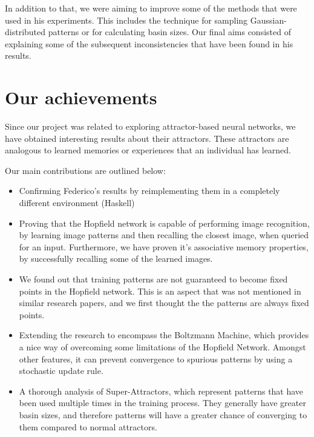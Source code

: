 In addition to that, we were aiming to improve some of the methods that were used in his experiments. This includes the technique for sampling Gaussian-distributed patterns or for calculating basin sizes. Our final aims consisted of explaining some of the subsequent inconsistencies that have been found in his results.

\section{Our achievements}

Since our project was related to exploring attractor-based neural networks, we have obtained interesting results about their attractors. These attractors are analogous to learned memories or experiences that an individual has learned.

Our main contributions are outlined below:
\begin{itemize}
\item Confirming Federico's results by reimplementing them in a completely different environment (Haskell)
\item Proving that the Hopfield network is capable of performing image recognition, by learning image patterns and then recalling the closest image, when queried for an input. Furthermore, we have proven it's associative memory properties, by successfully recalling some of the learned images.
\item We found out that training patterns are not guaranteed to become fixed points in the Hopfield network. This is an aspect that was not mentioned in similar research papers, and we first thought the the patterns are always fixed points.
\item Extending the research to encompass the Boltzmann Machine, which provides a nice way of overcoming some limitations of the Hopfield Network. Amongst other features, it can prevent convergence to spurious patterns by using a stochastic update rule.
\item A thorough analysis of Super-Attractors, which represent patterns that have been used multiple times in the training process. They generally have greater basin sizes, and therefore patterns will have a greater chance of converging to them compared to normal attractors.
\end{itemize}
